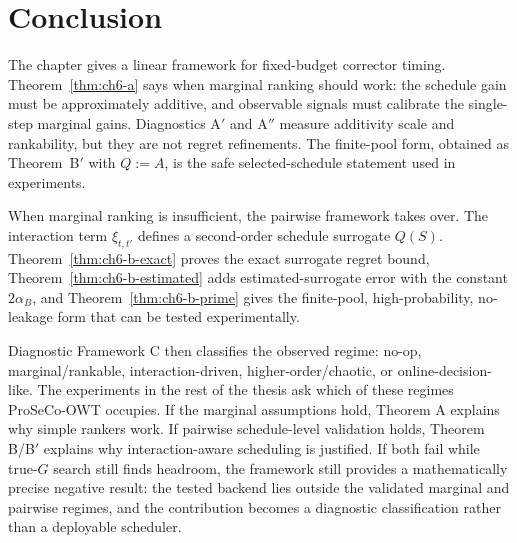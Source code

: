 \section{Conclusion}
\label{sec:ch6-conclusion}

The chapter gives a linear framework for fixed-budget corrector timing.
Theorem~\ref{thm:ch6-a} says when marginal ranking should work: the schedule
gain must be approximately additive, and observable signals must calibrate the
single-step marginal gains. Diagnostics A$'$ and A$''$ measure additivity scale
and rankability, but they are not regret refinements. The finite-pool form,
obtained as Theorem~B$'$ with $Q:=A$, is the safe selected-schedule statement
used in experiments.

When marginal ranking is insufficient, the pairwise framework takes over.
The interaction term $\xi_{t,t'}$ defines a second-order schedule surrogate
$Q(S)$. Theorem~\ref{thm:ch6-b-exact} proves the exact surrogate regret bound,
Theorem~\ref{thm:ch6-b-estimated} adds estimated-surrogate error with the
constant $2\alpha_B$, and Theorem~\ref{thm:ch6-b-prime} gives the finite-pool,
high-probability, no-leakage form that can be tested experimentally.

Diagnostic Framework C then classifies the observed regime: no-op,
marginal/rankable, interaction-driven, higher-order/chaotic, or
online-decision-like. The experiments in the rest of the thesis ask which of
these regimes ProSeCo-OWT occupies. If the marginal assumptions hold, Theorem A
explains why simple rankers work. If pairwise schedule-level validation holds,
Theorem B/B$'$ explains why interaction-aware scheduling is justified. If both
fail while true-$G$ search still finds headroom, the framework still provides a
mathematically precise negative result: the tested backend lies outside the
validated marginal and pairwise regimes, and the contribution becomes a
diagnostic classification rather than a deployable scheduler.
